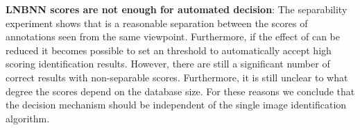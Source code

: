 \begin{itemln}
              \item \textbf{LNBNN scores are not enough for automated decision}:
                The separability experiment shows that is a reasonable
                  separation between the scores of annotations seen from
                  the same viewpoint.
                Furthermore, if the effect of \photobombings{} can be
                  reduced it becomes possible to set an threshold to
                  automatically accept high scoring identification
                  results.
                However, there are still a significant number of
                  correct results with non-separable scores.
                Furthermore, it is still unclear to what degree the
                  scores depend on the database size.
                For these reasons we conclude that the decision
                  mechanism should be independent of the single image
                  identification algorithm.
        \end{itemln}
